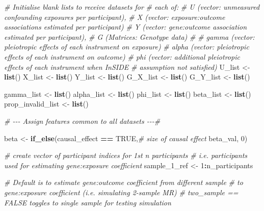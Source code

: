 \documentclass[
]{article}
\newenvironment{Shaded}{\begin{snugshade}}{\end{snugshade}}
\newcommand{\CommentTok}[1]{\textcolor[rgb]{0.56,0.35,0.01}{\textit{#1}}}
\newcommand{\ConstantTok}[1]{\textcolor[rgb]{0.56,0.35,0.01}{#1}}
\newcommand{\DecValTok}[1]{\textcolor[rgb]{0.00,0.00,0.81}{#1}}
\newcommand{\FunctionTok}[1]{\textcolor[rgb]{0.13,0.29,0.53}{\textbf{#1}}}
\newcommand{\NormalTok}[1]{#1}
\newcommand{\OtherTok}[1]{\textcolor[rgb]{0.56,0.35,0.01}{#1}}
\newcommand{\SpecialCharTok}[1]{\textcolor[rgb]{0.81,0.36,0.00}{\textbf{#1}}}
\begin{document}
\begin{Shaded}
\begin{Highlighting}[]
  \CommentTok{\# Initialise blank lists to receive datasets for}
  \CommentTok{\# each of:}
  \CommentTok{\#     U (vector: unmeasured confounding exposures per participant),}
  \CommentTok{\#     X (vector: exposure:outcome associations estimated per participant)}
  \CommentTok{\#     Y (vector: gene:outcome association estimated per participant),}
  \CommentTok{\#     G (Matrices: Genotype data)}
  \CommentTok{\#}
  \CommentTok{\#     gamma (vector: pleiotropic effects of each instrument on exposure)}
  \CommentTok{\#     alpha (vector: pleiotropic effects of each instrument on outcome)}
  \CommentTok{\#     phi (vector: additional pleiotropic effects of each instrument when InSIDE}
  \CommentTok{\#     assumption not satisfied)}
\NormalTok{   U\_list }\OtherTok{\textless{}{-}} \FunctionTok{list}\NormalTok{()}
\NormalTok{   X\_list }\OtherTok{\textless{}{-}} \FunctionTok{list}\NormalTok{()}
\NormalTok{   Y\_list }\OtherTok{\textless{}{-}} \FunctionTok{list}\NormalTok{()}
\NormalTok{   G\_X\_list }\OtherTok{\textless{}{-}} \FunctionTok{list}\NormalTok{()}
\NormalTok{   G\_Y\_list }\OtherTok{\textless{}{-}} \FunctionTok{list}\NormalTok{()}

\NormalTok{   gamma\_list }\OtherTok{\textless{}{-}} \FunctionTok{list}\NormalTok{()}
\NormalTok{   alpha\_list }\OtherTok{\textless{}{-}} \FunctionTok{list}\NormalTok{()}
\NormalTok{   phi\_list }\OtherTok{\textless{}{-}} \FunctionTok{list}\NormalTok{()}
\NormalTok{   beta\_list }\OtherTok{\textless{}{-}} \FunctionTok{list}\NormalTok{()}
\NormalTok{   prop\_invalid\_list }\OtherTok{\textless{}{-}} \FunctionTok{list}\NormalTok{()}


  \CommentTok{\# {-}{-}{-} Assign features common to all datasets {-}{-}{-}\#}

\NormalTok{   beta }\OtherTok{\textless{}{-}} \FunctionTok{if\_else}\NormalTok{(causal\_effect }\SpecialCharTok{==} \ConstantTok{TRUE}\NormalTok{,}\CommentTok{\# size of causal effect}
\NormalTok{                   beta\_val,}
                   \DecValTok{0}\NormalTok{)}

  \CommentTok{\# create vector of participant indices for 1st n participants}
  \CommentTok{\# i.e. participants used for estimating gene:exposure coefficient}
\NormalTok{   sample\_1\_ref }\OtherTok{\textless{}{-}} \DecValTok{1}\SpecialCharTok{:}\NormalTok{n\_participants}


  \CommentTok{\# Default is to estimate gene:outcome coefficient from different sample}
  \CommentTok{\# to gene:exposure coefficient (i.e. simulating 2{-}sample MR)}
  \CommentTok{\# two\_sample == FALSE toggles to single sample for testing simulation}


\end{Highlighting}
\end{Shaded}
\end{document}
